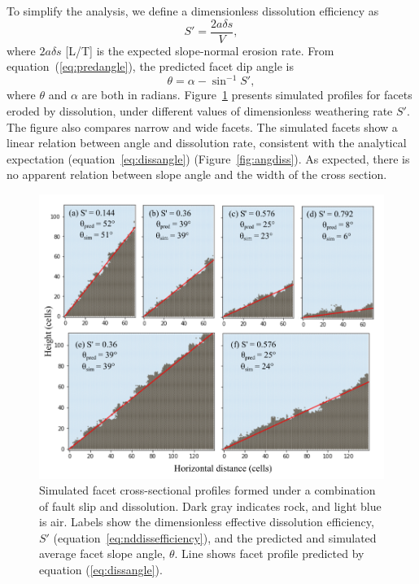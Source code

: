 To simplify the analysis, we define a dimensionless dissolution efficiency as
\begin{equation}
S' = \frac{2a\delta s}{V},
\label{eq:nddissefficiency}
\end{equation}
where $2a\delta s$ [L/T] is the expected slope-normal erosion rate. From equation~(\ref{eq:predangle}), the predicted facet dip angle is
\begin{equation}
\theta = \alpha - \sin^{-1} S',
\label{eq:dissangle}
\end{equation}
where $\theta$ and $\alpha$ are both in radians. Figure~\ref{fig:dissruns} presents simulated profiles for facets eroded by dissolution, under different values of dimensionless weathering rate $S'$. The figure also compares narrow and wide facets. The simulated facets show a linear relation between angle and dissolution rate, consistent with the analytical expectation (equation~\ref{eq:dissangle}) (Figure~\ref{fig:angdiss}). As expected, there is no apparent relation between slope angle and the width of the cross section.

\begin{figure}[ht!]
\centerline{\includegraphics{Figures/dissolution_model_profiles.pdf}}
\caption{Simulated facet cross-sectional profiles formed under a combination of fault slip and dissolution. Dark gray indicates rock, and light blue is air. Labels show the dimensionless effective dissolution efficiency, $S'$ (equation~\ref{eq:nddissefficiency}), and the predicted and simulated average facet slope angle, $\theta$. Line shows facet profile predicted by equation (\ref{eq:dissangle}).}
\label{fig:dissruns}
\end{figure}

